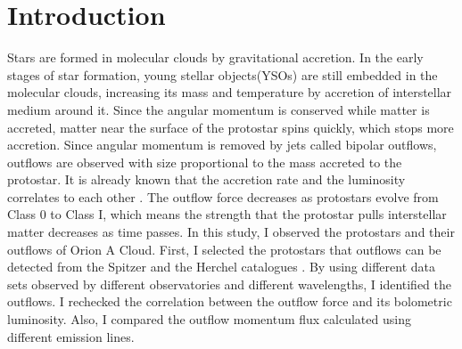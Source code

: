 
\section{Introduction}

Stars are formed in molecular clouds by gravitational accretion. In the early stages of star formation, young stellar objects(YSOs) are still embedded in the molecular clouds, increasing its mass and temperature by accretion of interstellar medium around it. Since the angular momentum is conserved while matter is accreted, matter near the surface of the protostar spins quickly, which stops more accretion. Since angular momentum is removed by jets called bipolar outflows, outflows are observed with size proportional to the mass accreted to the protostar\cite{bontemps1996evolution}. 
It is already known that the accretion rate and the luminosity correlates to each other \cite{kang2013outflow}. The outflow force decreases as protostars evolve from Class 0 to Class I, which means the strength that the protostar pulls interstellar matter decreases as time passes. 
In this study, I observed the protostars and their outflows of Orion A Cloud. First, I selected the protostars that outflows can be detected from the Spitzer and the Herchel catalogues \cite{megeath2012spitzer, furlan2016herschel}. By using different data sets observed by different observatories and different wavelengths, I identified the outflows. I rechecked the correlation between the outflow force and its bolometric luminosity. Also, I compared the outflow momentum flux calculated using different emission lines.